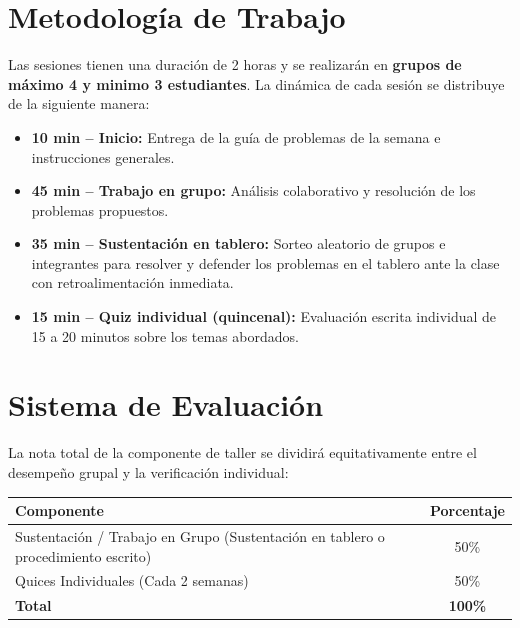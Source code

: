 \documentclass[11pt, letterpaper]{article}
\begin{document}
    \section{Metodología de Trabajo}
    
    Las sesiones tienen una duración de 2 horas y se realizarán en \textbf{grupos de máximo 4 y minimo 3 estudiantes}. La dinámica de cada sesión se distribuye de la siguiente manera:
    
    \begin{itemize}
        \item \textbf{10 min -- Inicio:} Entrega de la guía de problemas de la semana e instrucciones generales.
        \item \textbf{45 min -- Trabajo en grupo:} Análisis colaborativo y resolución de los problemas propuestos.
        \item \textbf{35 min -- Sustentación en tablero:} Sorteo aleatorio de grupos e integrantes para resolver y defender los problemas en el tablero ante la clase con retroalimentación inmediata.
        \item \textbf{15 min -- Quiz individual (quincenal):} Evaluación escrita individual de 15 a 20 minutos sobre los temas abordados.
    \end{itemize}
    
    \section{Sistema de Evaluación}
    
    La nota total de la componente de taller se dividirá equitativamente entre el desempeño grupal y la verificación individual:
    
    \begin{center}
        \begin{tabular}{@{}lc@{}}
            \toprule
            \textbf{Componente} & \textbf{Porcentaje} \\
            \midrule
            Sustentación / Trabajo en Grupo (Sustentación en tablero o procedimiento escrito) & 50\% \\
            Quices Individuales (Cada 2 semanas) & 50\% \\
            \midrule
            \textbf{Total} & \textbf{100\%} \\
            \bottomrule
        \end{tabular}
    \end{center}
    
\end{document}
